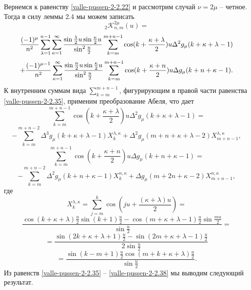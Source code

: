 Вернемся к равенству \eqref{valle-pussen-2-2.22} и рассмотрим случай $\nu=2\mu$ -- четное.
Тогда в силу леммы 2.4 мы можем записать
$$
 _2\mathcal{ K}_{n,m}^{2\mu}(u)=
 $$
 $$
 {(-1)^\mu\over n^2}\sum\limits_{\lambda=1}^{n-1}
\sum\limits_{\kappa=1}^{\infty}\frac{\sin\frac{\lambda}{2}u\sin\frac{\kappa}{2}u}
{\sin^2\frac u2}
\sum_{k=m}^{m+n-1}\cos(k+\frac{\kappa+\lambda}{2})u\Delta^2g_\mu(k+\kappa+\lambda-1)
$$
 \begin{equation}\label{valle-pussen-2-2.35}
    +{(-1)^{\mu-1}\over n^2}\sum\limits_{\kappa=1}^{\infty}
\frac{\sin\frac {n}{2}u\sin\frac{\kappa}{2}u}{\sin^2\frac u2}
\sum_{k=m}^{m+n-1}\cos(k+\frac{\kappa+n}{2})u\Delta g_\mu(k+n+\kappa-1).
 \end{equation}
 К внутренним суммам вида $\sum_{k=m}^{m+n-1}$, фигурирующим в правой части равенства \eqref{valle-pussen-2-2.35}, применим преобразование Абеля, что дает
 $$
 \sum_{k=m}^{m+n-1}\cos(k+\frac{\kappa+\lambda}{2})u\Delta^2g_\mu(k+\kappa+\lambda-1)=
 $$
 \begin{equation}\label{valle-pussen-2-2.36}
-\sum_{k=m}^{m+n-2}\Delta^3g_\mu(k+\kappa+\lambda-1)X_k^{\lambda,\kappa}
+\Delta^2g_\mu(m+n+\kappa+\lambda-2)X_{m+n-1}^{\lambda,\kappa},
\end{equation}
$$
\sum_{k=m}^{m+n-1}\cos(k+\frac{\kappa+n}{2})u\Delta g_\mu(k+n+\kappa-1)=
$$
 \begin{equation}\label{valle-pussen-2-2.37}
-\sum_{k=m}^{m+n-2}\Delta^2g_\mu(k+n+\kappa-1)X_k^{n,\kappa}
+\Delta g_\mu(m+2n+\kappa-2)X_{m+n-1}^{n,\kappa},
    \end{equation}
где
$$
X_k^{\lambda,\kappa}=\sum_{j=m}^k \cos(ju+\frac{(\kappa+\lambda)u}{2})=
$$
$$
\frac{\cos(k+\kappa+\lambda)\frac{u}{2}\sin(k+1)\frac{u}{2}-
\cos(m+\kappa+\lambda-1)\frac{u}{2}\sin\frac{mu}{2}}{\sin\frac{u}{2}}=
$$
$$
=\frac{\sin(2k+\kappa+\lambda+1)\frac{u}{2}-\sin(2m+\kappa+\lambda-1)\frac{u}{2}}{2\sin\frac{u}{2}}
$$
 \begin{equation}\label{valle-pussen-2-2.38}
=\frac{\sin(k-m+1)\frac{u}{2}\cos(m+k+\kappa+\lambda)\frac{u}{2}}{\sin\frac{u}{2}}.
    \end{equation}
Из равенств \eqref{valle-pussen-2-2.35} -- \eqref{valle-pussen-2-2.38} мы выводим следующий результат.

